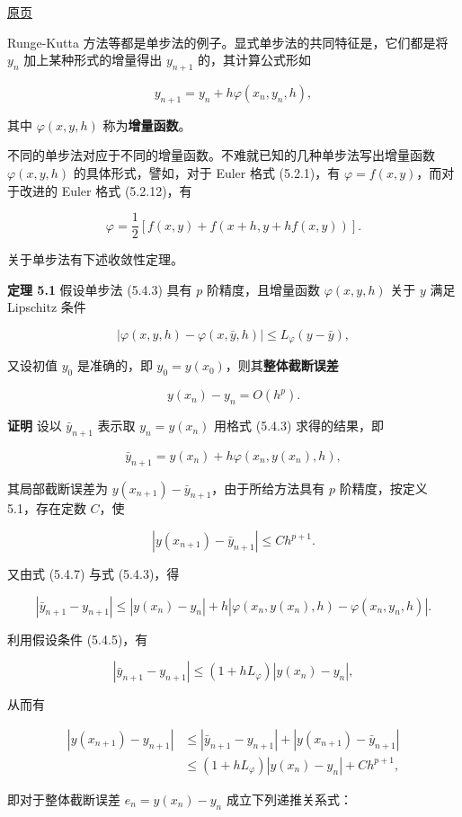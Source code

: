 \documentclass[
  10pt,
  fontset=fandol]{ctexart}
\begin{document}
\href{../../source-images/pdf-134.jpeg}{原页}

Runge-Kutta 方法等都是单步法的例子。显式单步法的共同特征是，它们都是将 \(y_n\) 加上某种形式的增量得出 \(y_{n+1}\) 的，其计算公式形如

\[
y_{n+1}=y_n+h\varphi(x_n,y_n,h),\tag{5.4.3}
\]

其中 \(\varphi(x,y,h)\) 称为\textbf{增量函数}。

不同的单步法对应于不同的增量函数。不难就已知的几种单步法写出增量函数 \(\varphi(x,y,h)\) 的具体形式，譬如，对于 Euler 格式 (5.2.1)，有 \(\varphi=f(x,y)\)，而对于改进的 Euler 格式 (5.2.12)，有

\[
\varphi=\frac12[f(x,y)+f(x+h,y+hf(x,y))].\tag{5.4.4}
\]

关于单步法有下述收敛性定理。

\textbf{定理 5.1} 假设单步法 (5.4.3) 具有 \(p\) 阶精度，且增量函数 \(\varphi(x,y,h)\) 关于 \(y\) 满足 Lipschitz 条件

\[
|\varphi(x,y,h)-\varphi(x,\bar y,h)|\leqslant L_\varphi(y-\bar y),\tag{5.4.5}
\]

又设初值 \(y_0\) 是准确的，即 \(y_0=y(x_0)\)，则其\textbf{整体截断误差}

\[
y(x_n)-y_n=O(h^p).\tag{5.4.6}
\]

\textbf{证明} 设以 \(\bar y_{n+1}\) 表示取 \(y_n=y(x_n)\) 用格式 (5.4.3) 求得的结果，即

\[
\bar y_{n+1}=y(x_n)+h\varphi(x_n,y(x_n),h),\tag{5.4.7}
\]

其局部截断误差为 \(y(x_{n+1})-\bar y_{n+1}\)，由于所给方法具有 \(p\) 阶精度，按定义 5.1，存在定数 \(C\)，使

\[
|y(x_{n+1})-\bar y_{n+1}|\leqslant Ch^{p+1}.
\]

又由式 (5.4.7) 与式 (5.4.3)，得

\[
|\bar y_{n+1}-y_{n+1}|\leqslant|y(x_n)-y_n|+h|\varphi(x_n,y(x_n),h)-\varphi(x_n,y_n,h)|.
\]

利用假设条件 (5.4.5)，有

\[
|\bar y_{n+1}-y_{n+1}|\leqslant(1+hL_\varphi)|y(x_n)-y_n|,
\]

从而有

\[
\begin{aligned}
|y(x_{n+1})-y_{n+1}|&\leqslant|\bar y_{n+1}-y_{n+1}|+|y(x_{n+1})-\bar y_{n+1}|\\
&\leqslant(1+hL_\varphi)|y(x_n)-y_n|+Ch^{p+1},
\end{aligned}
\]

即对于整体截断误差 \(e_n=y(x_n)-y_n\) 成立下列递推关系式：
\end{document}
